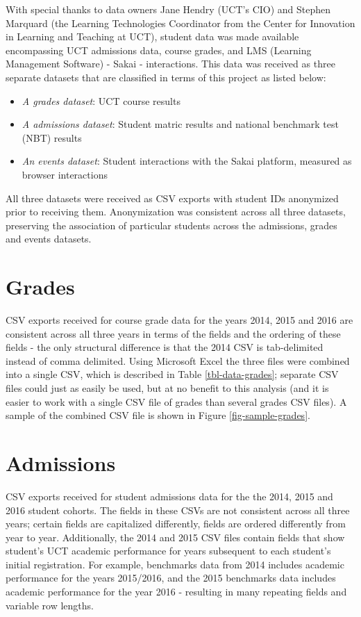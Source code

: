 With special thanks to data owners Jane Hendry (UCT's CIO) and Stephen Marquard (the Learning Technologies Coordinator from the Center for Innovation in Learning and Teaching at UCT), student data was made available encompassing UCT admissions data, course grades, and LMS (Learning Management Software) - Sakai \cite{sakai} - interactions. This data was received as three separate datasets that are classified in terms of this project as listed below:

\begin{itemize}
    \item \textit{A grades dataset}: UCT course results
    \item \textit{A admissions dataset}: Student matric results and national benchmark test (NBT) results
    \item \textit{An events dataset}: Student interactions with the Sakai platform, measured as browser interactions
\end{itemize}

All three datasets were received as CSV exports with student IDs anonymized prior to receiving them. Anonymization was consistent across all three datasets, preserving the association of particular students across the admissions, grades and events datasets.

\section{Grades}
CSV exports received for course grade data for the years 2014, 2015 and 2016 are consistent across all three years in terms of the fields and the ordering of these fields - the only structural difference is that the 2014 CSV is tab-delimited instead of comma delimited. Using Microsoft Excel the three files were combined into a single CSV, which is described in Table \ref{tbl-data-grades}; separate CSV files could just as easily be used, but at no benefit to this analysis (and it is easier to work with a single CSV file of grades than several grades CSV files). A sample of the combined CSV file is shown in Figure \ref{fig-sample-grades}.




\section{Admissions}
CSV exports received for student admissions data for the the 2014, 2015 and 2016 student cohorts. The fields in these CSVs are not consistent across all three years; certain fields are capitalized differently, fields are ordered differently from year to year. Additionally, the 2014 and 2015 CSV files contain fields that show student's UCT academic performance for years subsequent to each student's initial registration. For example, benchmarks data from 2014 includes academic performance for the years 2015/2016, and the 2015 benchmarks data includes academic performance for the year 2016 - resulting in many repeating fields and variable row lengths.

